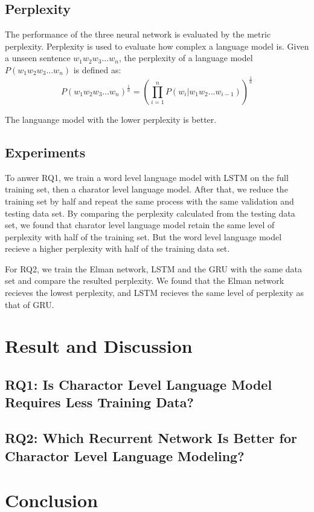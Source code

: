 \documentclass[]{article}
\begin{document}
\subsection{Perplexity}
The performance of the three neural network is evaluated by the metric perplexity. 
Perplexity is used to evaluate how complex a language model is. 
Given a unseen sentence $w_1w_2w_3...w_n$, the perplexity of a language model $P(w_1w_2w_3...w_n)$ is defined as:
\begin{equation}
	P(w_1w_2w_3...w_n)^{\frac{1}{n}} = (\prod_{i=1}^{n}P(w_i|w_1w_2...w_{i-1}) )^{\frac{1}{n} }
\end{equation}

The languange model with the lower perplexity is better.


\subsection{Experiments}
To anwer RQ1, we train a word level language model with LSTM on the full training set, then a charator level language model. 
After that, we reduce the training set by half and repeat the same process with the same validation and testing data set. 
By comparing the perplexity calculated from the testing data set, we found that charator level language model retain the same level of perplexity with half of the training set.
But the word level language model recieve a higher perplexity with half of the training data set.

For RQ2, we train the Elman network, LSTM and the GRU with the same data set and compare the resulted perplexity.
We found that the Elman network recieves the lowest perplexity, and LSTM recieves the same level of perplexity as that of GRU. 

\section{Result and Discussion}

\subsection{RQ1: Is Charactor Level Language Model Requires Less Training Data?}


\subsection{RQ2: Which Recurrent Network Is Better for Charactor Level Language Modeling?}



\section{Conclusion}




















\end{document}
